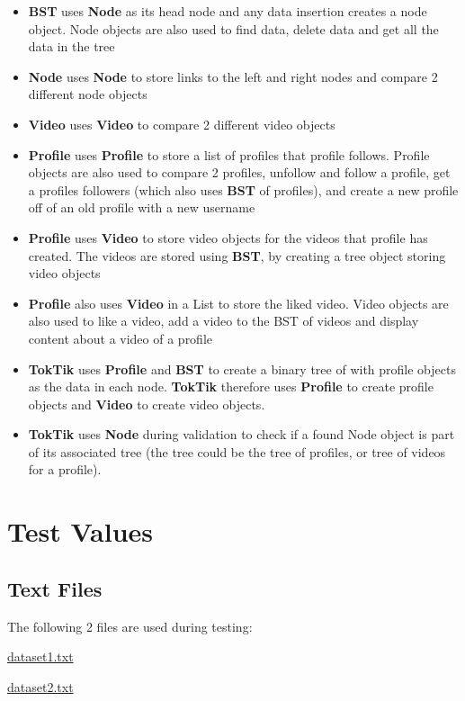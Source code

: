 \documentclass{assignment}
\begin{document}
\begin{itemize}
    \item \textbf{BST} uses \textbf{Node} as its head node and any data insertion creates a node object. Node objects are also used to find data, delete data and get all the data in the tree
    
    \item \textbf{Node} uses \textbf{Node} to store links to the left and right nodes and compare 2 different node objects
    \item \textbf{Video} uses \textbf{Video} to compare 2 different video objects
    \item \textbf{Profile} uses \textbf{Profile} to store a list of profiles that profile follows. Profile objects are also used to compare 2 profiles, unfollow and follow a profile, get a profiles followers (which also uses \textbf{BST} of profiles), and create a new profile off of an old profile with a new username
    
    \item \textbf{Profile} uses \textbf{Video} to store video objects for the videos that profile has created. The videos are stored using \textbf{BST}, by creating a tree object storing video objects
    \item \textbf{Profile} also uses \textbf{Video} in a List to store the liked video. Video objects are also used to like a video, add a video to the BST of videos and display content about a video of a profile
    \item \textbf{TokTik} uses \textbf{Profile} and \textbf{BST} to create a binary tree of with profile objects as the data in each node. \textbf{TokTik} therefore uses \textbf{Profile} to create profile objects and \textbf{Video} to create video objects. 
    \item \textbf{TokTik} uses  \textbf{Node} during validation to check if a found Node object is part of its associated tree (the tree could be the tree of profiles, or tree of videos for a profile).
    
\end{itemize}


\newpage
\section{Test Values}
\subsection{Text Files}
The following 2 files are used during testing:  
\begin{center}
\underline{dataset1.txt}
\end{center}

\begin{center}
\underline{dataset2.txt}
\end{center}
\end{document}
